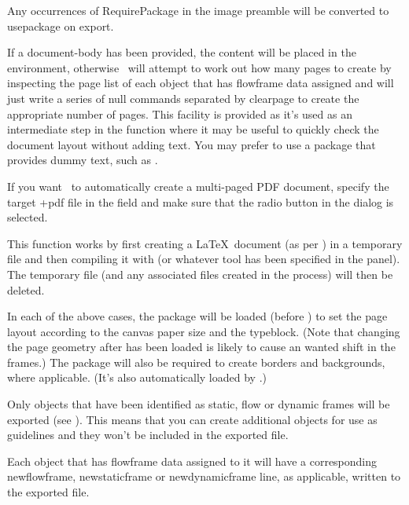 Any occurrences of \gls{RequirePackage} in the image
preamble will be converted to \gls{usepackage} on export.

If a \gls{document-body} has been provided, the content will be
placed in the  environment,
otherwise \FlowframTk\ will attempt to work out how many pages to
create by inspecting the page list of each \gls{object} that has
\gls{flowframe} data assigned and will just write a series of
\gls{null} commands separated by \gls{clearpage} to create the appropriate
number of pages. This facility is provided as it's used as an
intermediate step in the  function where it
may be useful to quickly check the document layout without adding
text. You may prefer to use a package that provides dummy text, such
as .


If you want \FlowframTk\ to automatically create a multi-paged PDF 
document, specify the target \ext+{pdf} file in the
 field and make sure that the
 radio button in the  dialog
is selected.

This function works by first creating a \LaTeX\ document
(as per )
in a temporary file and then compiling it with
 (or whatever tool has been specified in the
 panel). The temporary file (and any
associated files created in the process) will then be deleted.

In each of the above cases, the  package will be
loaded (before ) to set the page layout according to
the \gls{canvas} paper size and the \gls{typeblock}. (Note that
changing the page geometry after  has been loaded is
likely to cause an wanted shift in the frames.)
The  package will also be
required to create borders and backgrounds, where applicable.
(It's also automatically loaded by .)

Only \glspl{object} that have been identified as static, flow or
dynamic frames will be exported (see ).
This means that you can create additional \glspl{object} for use as
guidelines and they won't be included in the exported file.

Each \gls{object} that has \gls{flowframe} data
assigned to it will have a corresponding \gls{newflowframe},
\gls{newstaticframe} or \gls{newdynamicframe} line, as applicable,
written to the exported file.

